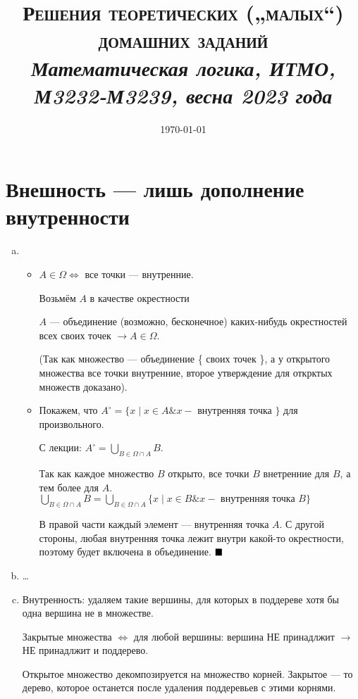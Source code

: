\documentclass[12pt, a4paper]{article}
\title{{\Large\textsc{Решения \textbf{теоретических („малых“) домашних заданий}}}\\
\it Математическая логика, ИТМО, М3232-М3239, весна 2023 года}
\author{
  \vova
}
\date{\today}
\begin{document}
  \tittoc

\section{Внешность — лишь дополнение внутренности}

\begin{enumerate}[(a)]
    
    \item \begin{itemize}
        \item $A \in \Omega \Leftrightarrow$ все точки — внутренние.

        \rightimp Возьмём $A$ в качестве окрестности
    
        \leftimp $A$ — объединение (возможно, бесконечное) каких-нибудь окрестностей всех своих точек $→ A \in \Omega$.
    
        (Так как множество — объединение \{ своих точек \},
        а у открытого множества все точки внутренние,
        второе утверждение для открктых множеств доказано).

        \item Покажем, что $A^{\circ}=\{x \mid x \in A \& x-\text { внутренняя точка }\}$ для произвольного.
        
        С лекции: $A^{\circ} = \bigcup_{B \in \Omega \cap A} B$.

        Так как каждое множество $B$ открыто, все точки $B$ внетренние для $B$, а тем более для $A$. $\bigcup_{B \in \Omega \cap A} B = \bigcup_{B \in \Omega \cap A} \{x \mid x \in B \& x-\text { внутренняя точка } B\}$

        В правой части каждый элемент — внутренняя точка $A$.
        С другой стороны, любая внутренняя точка лежит внутри какой-то окрестности,
        поэтому будет включена в объединение. $\qed$
    \end{itemize}

    \item …
    
    \item Внутренность: удаляем такие вершины, для которых в поддереве хотя бы одна вершина не в множестве.
    
    Закрытые множества $\Leftrightarrow$ для любой вершины: вершина НЕ принадлжит $→$ НЕ принадлжит и поддерево.

    
    Открытое множество декомпозируется на множество корней.
    Закрытое — то дерево, которое останется после удаления поддеревьев с этими корнями.
    

\end{enumerate}
\end{document}
